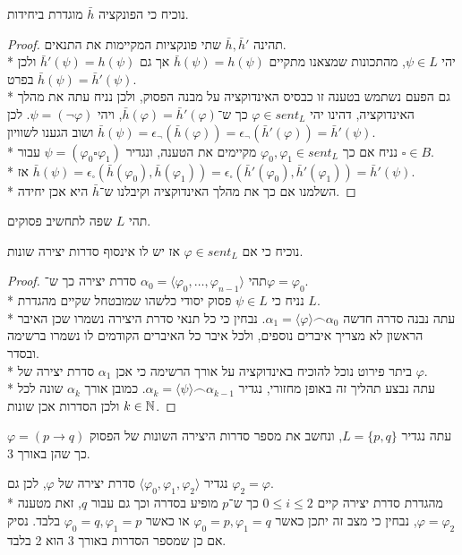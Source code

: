 \Subquestion{}
נוכיח כי הפונקציה $\bar{h}$ מוגדרת ביחידות.
\begin{proof}
	תהינה $\bar{h}, \bar{h}'$ שתי פונקציות המקיימות את התנאים. \\*
	יהי $\psi \in L$, מהתכונות שמצאנו מתקיים $\bar{h}(\psi) = h(\psi)$ אך גם $\bar{h}'(\psi) = h(\psi)$ ולכן בפרט $\bar{h}(\psi) = \bar{h}'(\psi)$. \\*
	גם הפעם נשתמש בטענה זו כבסיס האינדוקציה על מבנה הפסוק, ולכן נניח עתה את מהלך האינדוקציה, דהינו יהי $\varphi \in sent_L$ כך ש־$\bar{h}(\varphi) = \bar{h}'(\varphi)$, ויהי $\psi = (\lnot \varphi)$.
	לכן $\bar{h}(\psi) = \epsilon_\lnot(\bar{h}(\varphi)) = \epsilon_\lnot(\bar{h}'(\varphi)) = \bar{h}'(\psi)$ ושוב הגענו לשוויון. \\*
	נניח אם כך $\varphi_0, \varphi_1 \in sent_L$ מקיימים את הטענה, ונגדיר $\psi = (\varphi_0 \square \varphi_1)$ עבור $\square \in B$. \\*
	אז $\bar{h}(\psi) = \epsilon_\square(\bar{h}(\varphi_0), \bar{h}(\varphi_1)) = \epsilon_\square(\bar{h}'(\varphi_0), \bar{h}'(\varphi_1)) = \bar{h}'(\psi)$. \\*
	השלמנו אם כך את מהלך האינדוקציה וקיבלנו ש־$\bar{h}$ היא אכן יחידה.
\end{proof}

\Question{}
תהי $L$ שפה לתחשיב פסוקים.

\Subquestion{}
נוכיח כי אם $\varphi \in sent_L$ אז יש לו אינסוף סדרות יצירה שונות.
\begin{proof}
	תהי $\alpha_0 = \langle \varphi_0, \dots, \varphi_{n - 1} \rangle$ סדרת יצירה כך ש־$\varphi = \varphi_0$. \\*
	נניח כי $\psi \in L$ פסוק יסודי כלשהו שמובטחל שקיים מהגדרת $L$. \\*
	עתה נבנה סדרה חדשה $\alpha_1 = \langle \varphi \rangle \frown \alpha_0$.
	נבחין כי כל תנאי סדרת היצירה נשמרו שכן האיבר הראשון לא מצריך איברים נוספים, ולכל איבר כל האיברים הקודמים לו נשמרו ברשימה ובסדר. \\*
	ביתר פירוט נוכל להוכיח באינדוקציה על אורך הרשימה כי אכן $\alpha_1$ סדרת יצירה של $\varphi$. \\*
	עתה נבצע תהליך זה באופן מחזורי, נגדיר $\alpha_k = \langle \psi \rangle \frown \alpha_{k - 1}$.
	כמובן אורך $\alpha_k$ שונה לכל $k \in \mathbb{N}$ ולכן הסדרות אכן שונות.
\end{proof}

\Subquestion{}
עתה נגדיר $L = \{ p, q \}$, ונחשב את מספר סדרות היצירה השונות של הפסוק $\varphi = (p \to q)$ כך שהן באורך 3.
\begin{solution}
	נגדיר $\langle \varphi_0, \varphi_1, \varphi_2 \rangle$ סדרת יצירה של $\varphi$, לכן גם $\varphi_2 = \varphi$. \\*
	מהגדרת סדרת יצירה קיים $0 \le i \le 2$ כך ש־$p$ מופיע בסדרה וכך גם עבור $q$, זאת מטענה $\varphi = \varphi_2$, נבחין כי מצב זה יתכן כאשר $\varphi_0 = p, \varphi_1 = q$ או כאשר $\varphi_0 = q, \varphi_1 = p$ בלבד.
	נסיק אם כן שמספר הסדרות באורך 3 הוא 2 בלבד.
\end{solution}



